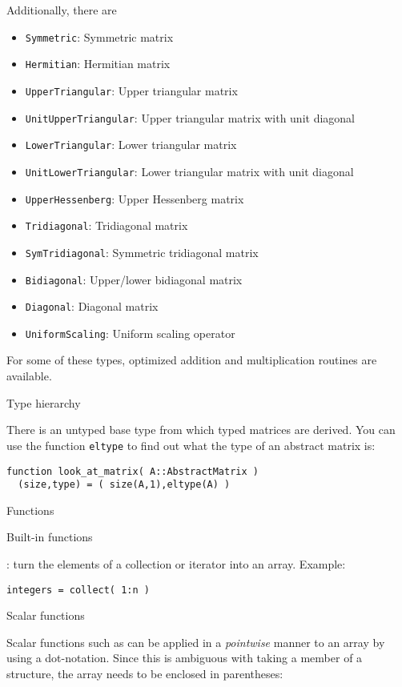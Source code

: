 Additionally, there are
\begin{itemize}
\item  \lstinline{Symmetric}:	Symmetric matrix
\item  \lstinline{Hermitian}:	Hermitian matrix
\item  \lstinline{UpperTriangular}:	Upper triangular matrix
\item  \lstinline{UnitUpperTriangular}:	Upper triangular matrix with unit diagonal
\item  \lstinline{LowerTriangular}:	Lower triangular matrix
\item  \lstinline{UnitLowerTriangular}:	Lower triangular matrix with unit diagonal
\item  \lstinline{UpperHessenberg}:	Upper Hessenberg matrix
\item  \lstinline{Tridiagonal}:	Tridiagonal matrix
\item  \lstinline{SymTridiagonal}:	Symmetric tridiagonal matrix
\item  \lstinline{Bidiagonal}:	Upper/lower bidiagonal matrix
\item  \lstinline{Diagonal}:	Diagonal matrix
\item  \lstinline{UniformScaling}:	Uniform scaling operator
\end{itemize}

For some of these types, optimized addition and multiplication
routines are available.

 {Type hierarchy}

There is an untyped base type  from
which typed matrices are derived.
You can use the function \lstinline{eltype}
to find out what the type of an abstract matrix is:
\begin{lstlisting}
function look_at_matrix( A::AbstractMatrix )
  (size,type) = ( size(A,1),eltype(A) )
\end{lstlisting}

 {Functions}

 {Built-in functions}

: turn the elements of a collection or iterator
into an array. Example:
\begin{lstlisting}
integers = collect( 1:n )
\end{lstlisting}

 {Scalar functions}

Scalar functions such as  can be applied in a
\emph{pointwise}
manner to an array by using a dot-notation.
Since this is ambiguous with taking a member of a structure,
the array needs to be enclosed in parentheses:

